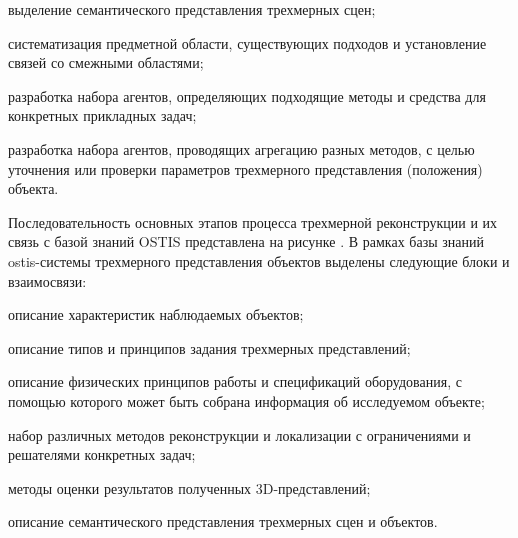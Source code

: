 \begin{textitemize}
    \item выделение семантического представления трехмерных сцен;
    \item систематизация предметной области, существующих подходов и установление связей со смежными областями;
    \item разработка набора агентов, определяющих подходящие методы и средства для конкретных прикладных задач;
    \item разработка набора агентов, проводящих агрегацию разных методов, с целью уточнения или проверки параметров трехмерного представления (положения) объекта.
\end{textitemize}

Последовательность основных этапов процесса трехмерной реконструкции и их связь с базой знаний OSTIS представлена на рисунке \textit{}. В рамках базы знаний ostis-системы трехмерного представления объектов выделены следующие блоки и взаимосвязи:

\begin{textitemize}
    \item описание характеристик наблюдаемых объектов;
    \item описание типов и принципов задания трехмерных представлений;
    \item описание физических принципов работы и спецификаций оборудования, с помощью которого может быть собрана информация об исследуемом объекте;
    \item набор различных методов реконструкции и локализации с ограничениями и решателями конкретных задач;
    \item методы оценки результатов полученных 3D-представлений;
    \item описание семантического представления трехмерных сцен и объектов.
\end{textitemize}

